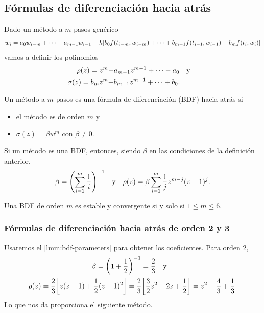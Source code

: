 \subsection{Fórmulas de diferenciación hacia atrás}

Dado un método a $m$-pasos genérico
\begin{equation*}
    w_i = a_0w_{i-m} + \dots + a_{m-1}w_{i-1} + h\qty[
        b_0f(t_{i-m}, w_{i-m}) + \dots + b_{m-1}f(t_{i-1}, w_{i-1})
        + b_mf(t_i, w_i)
    ]
\end{equation*}
vamos a definir los polinomios
\begin{align*}
    \rho(z) = z^m -& a_{m-1}z^{m-1} + \dots - a_0 \qq{y} \\
    \sigma(z) = b_mz^m +& b_{m-1}z^{m-1} + \dots + b_0.
\end{align*}

\begin{definition}
    Un método a $m$-pasos es una fórmula de diferenciación (BDF) hacia atrás si
    \begin{itemize}
        \item el método es de orden $m$ y
        \item $\sigma(z) = \beta w^m$ con $\beta \ne 0$.
    \end{itemize}
\end{definition}

\begin{lemma}\label{lmm:bdf-parameters}
    Si un método es una BDF, entonces,
    siendo $\beta$ en las condiciones de la definición anterior,
    \begin{equation*}
        \beta = \qty(\sum_{i=1}^m \frac{1}{i})^{-1} \qq{y}
        \rho(z) = \beta\sum_{i=1}^m \frac{1}{j}z^{m-j}(z-1)^j.
    \end{equation*}
\end{lemma}

\begin{theorem}
    Una BDF de orden $m$ es estable y convergente si y solo si $1 \le m \le 6$.
\end{theorem}

\subsubsection{Fórmulas de diferenciación hacia atrás de orden 2 y 3}

Usaremos el \cref{lmm:bdf-parameters} para obtener los coeficientes.
Para orden $2$,
\begin{gather*}
    \beta = \qty(1 + \frac{1}{2})^{-1} = \frac{2}{3} \qq{y} \\
    \rho(z) = \frac{2}{3}\qty[z(z-1) + \frac{1}{2}(z-1)^2] =
    \frac{2}{3}\qty[\frac{3}{2}z^2 - 2z + \frac{1}{2}] =
    z^2 - \frac{4}{3} + \frac{1}{3}.
\end{gather*}
Lo que nos da proporciona el siguiente método.

